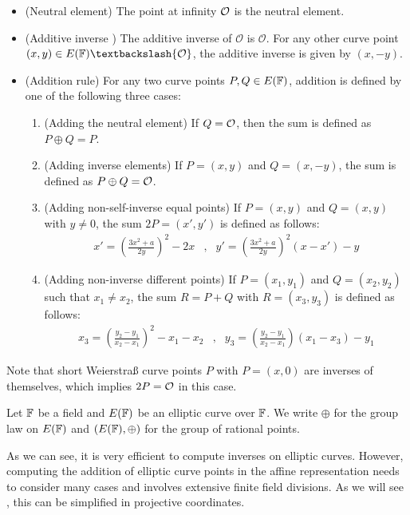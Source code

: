 \begin{definition}{}\label{def:chord-tangent-algebra}
\begin{itemize}
\item (Neutral element) The point at infinity $\mathcal{O}$ is the neutral element.
\item (Additive inverse ) The additive inverse of $\mathcal{O}$ is $\mathcal{O}$. For any other curve point $(x,y) \in E(\F)\textbackslash \{\mathcal{O}\}$, the additive inverse is given by $(x,-y)$.
\item (Addition rule) For any two curve points $P, Q \in E(\mathbb{F})$, addition is defined by one of the following three cases:
\begin{enumerate}
\item (Adding the neutral element) If $Q=\mathcal{O}$, then the sum is defined as $P\oplus Q=P$.
\item (Adding inverse elements)  If $P=(x,y)$ and $Q=(x,-y)$, the sum is defined as $P\oplus Q=\mathcal{O}$.
\item (Adding non-self-inverse equal points) If $P=(x,y)$ and $Q=(x,y)$ with $y\neq 0$, the sum $2P=(x',y')$ is defined as follows:
$$
\begin{array}{llr}
x' = \left(\frac{3x^2+a}{2y}\right)^2 -2x &,&
y' = \left(\frac{3x^2+a}{2y}\right)^2\left(x-x'\right) - y
\end{array} 
$$
\item (Adding non-inverse different points) If $P=(x_1,y_1)$ and $Q=(x_2,y_2)$ such that $x_1 \neq x_2$, the sum $R=P+Q$ with $R=(x_3,y_3)$ is defined as follows:
$$
\begin{array}{llr}
x_3 = \left(\frac{y_2-y_1}{x_2-x_1}\right)^2 -x_1-x_2 &, &
y_3 = \left(\frac{y_2-y_1}{x_2-x_1} \right)\left(x_1-x_3\right) - y_1
\end{array} 
$$
\end{enumerate}
\end{itemize} 
\end{definition}
Note that short Weierstraß curve points $P$ with $P=(x,0)$ are inverses of themselves, which implies $2P=\mathcal{O}$ in this case.
\begin{notation}
Let $\mathbb{F}$ be a field and $E(\mathbb{F})$ be an elliptic curve over $\mathbb{F}$. We write $\oplus$ for the group law on $E(\mathbb{F})$ and $(E(\mathbb{F}),\oplus)$ for the group of rational points.
\end{notation}
As we can see, it is very efficient to compute inverses on elliptic curves. However, computing the addition of elliptic curve points in the affine representation needs to consider many cases and involves extensive finite field divisions. As we will see , this can be simplified in projective coordinates.

